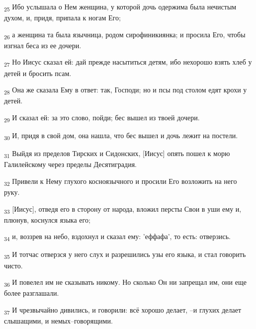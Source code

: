 \begin{tcolorbox}
\textsubscript{25} Ибо услышала о Нем женщина, у которой дочь одержима была нечистым духом, и, придя, припала к ногам Его;
\end{tcolorbox}
\begin{tcolorbox}
\textsubscript{26} а женщина та была язычница, родом сирофиникиянка; и просила Его, чтобы изгнал беса из ее дочери.
\end{tcolorbox}
\begin{tcolorbox}
\textsubscript{27} Но Иисус сказал ей: дай прежде насытиться детям, ибо нехорошо взять хлеб у детей и бросить псам.
\end{tcolorbox}
\begin{tcolorbox}
\textsubscript{28} Она же сказала Ему в ответ: так, Господи; но и псы под столом едят крохи у детей.
\end{tcolorbox}
\begin{tcolorbox}
\textsubscript{29} И сказал ей: за это слово, пойди; бес вышел из твоей дочери.
\end{tcolorbox}
\begin{tcolorbox}
\textsubscript{30} И, придя в свой дом, она нашла, что бес вышел и дочь лежит на постели.
\end{tcolorbox}
\begin{tcolorbox}
\textsubscript{31} Выйдя из пределов Тирских и Сидонских, [Иисус] опять пошел к морю Галилейскому через пределы Десятиградия.
\end{tcolorbox}
\begin{tcolorbox}
\textsubscript{32} Привели к Нему глухого косноязычного и просили Его возложить на него руку.
\end{tcolorbox}
\begin{tcolorbox}
\textsubscript{33} [Иисус], отведя его в сторону от народа, вложил персты Свои в уши ему и, плюнув, коснулся языка его;
\end{tcolorbox}
\begin{tcolorbox}
\textsubscript{34} и, воззрев на небо, вздохнул и сказал ему: 'еффафа', то есть: отверзись.
\end{tcolorbox}
\begin{tcolorbox}
\textsubscript{35} И тотчас отверзся у него слух и разрешились узы его языка, и стал говорить чисто.
\end{tcolorbox}
\begin{tcolorbox}
\textsubscript{36} И повелел им не сказывать никому. Но сколько Он ни запрещал им, они еще более разглашали.
\end{tcolorbox}
\begin{tcolorbox}
\textsubscript{37} И чрезвычайно дивились, и говорили: всё хорошо делает, --и глухих делает слышащими, и немых--говорящими.
\end{tcolorbox}

